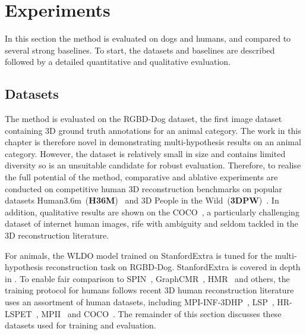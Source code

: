 \section{Experiments}\label{s:exp}

In this section the method is evaluated on dogs and humans, and compared to several strong baselines.
To start, the datasets and baselines are described followed by a detailed quantitative and qualitative evaluation.





\subsection{Datasets}

The method is evaluated on the RGBD-Dog dataset, the first image dataset containing 3D ground truth annotations for an animal category. The work in this chapter is therefore novel in demonstrating multi-hypothesis results on an animal category. However, the dataset is relatively small in size and contains limited diversity so is an unsuitable candidate for robust evaluation. Therefore, to realise the full potential of the method, comparative and ablative experiments are conducted on competitive human 3D reconstruction benchmarks on popular datasets Human3.6m~(\textbf{H36M})~\cite{ionescu2013human3,IonescuSminchisescu11} and 3D People in the Wild~(\textbf{3DPW})~\cite{vonmarcard2018recovering}. In addition, qualitative results are shown on the COCO~\cite{xxx}, a particularly challenging dataset of internet human images, rife with ambiguity and seldom tackled in the 3D reconstruction literature. 

For animals, the WLDO model trained on StanfordExtra is tuned for the multi-hypothesis reconstruction task on RGBD-Dog. StanfordExtra is covered in depth in . To enable fair comparison to SPIN~\cite{kolotouros19learning}, GraphCMR~\cite{kolotouros19learning}, HMR~\cite{kanazawa18end-to-end} and others, the training protocol for humans follows recent 3D human reconstruction literature uses an assortment of human datasets, including MPI-INF-3DHP~\cite{xxx}, LSP~\cite{}, HR-LSPET~\cite{}, MPII~\cite{} and COCO~\cite{}. 
The remainder of this section discusses these datasets used for training and evaluation. 


